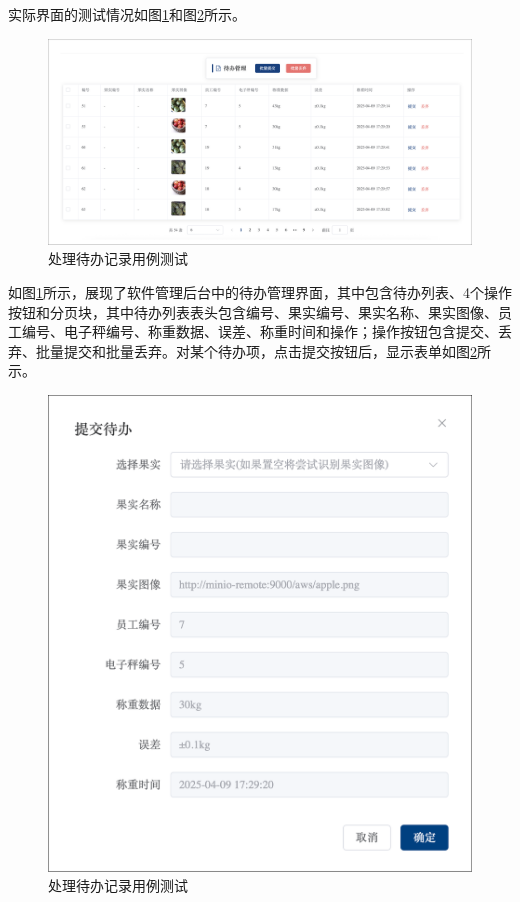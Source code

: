 实际界面的测试情况如图\ref{fig:todo-handle-result-1}和图\ref{fig:todo-handle-result-2}所示。

\begin{figure}[H]
    \centering
    \includegraphics[width=0.95\linewidth]{../result/todo-handle-result-1.png}
    \caption{处理待办记录用例测试}
    \label{fig:todo-handle-result-1}
\end{figure}

如图\ref{fig:todo-handle-result-1}所示，展现了软件管理后台中的待办管理界面，其中包含待办列表、4个操作按钮和分页块，其中待办列表表头包含编号、果实编号、果实名称、果实图像、员工编号、电子秤编号、称重数据、误差、称重时间和操作；操作按钮包含提交、丢弃、批量提交和批量丢弃。对某个待办项，点击提交按钮后，显示表单如图\ref{fig:todo-handle-result-2}所示。

\begin{figure}[H]
    \centering
    \includegraphics[width=0.8\linewidth]{../result/todo-handle-result-2.png}
    \caption{处理待办记录用例测试}
    \label{fig:todo-handle-result-2}
\end{figure}

